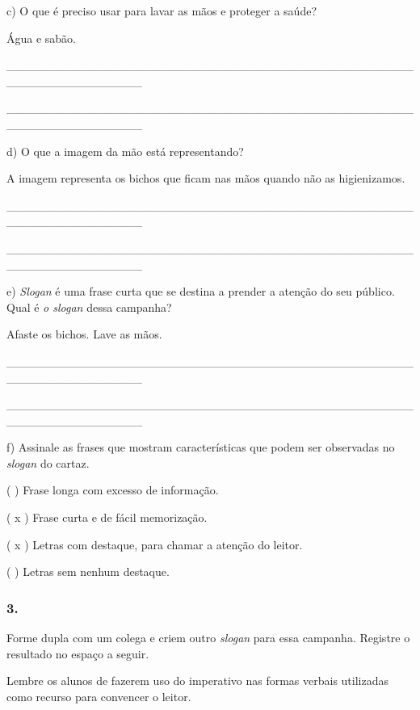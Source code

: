 c) O que é preciso usar para lavar as mãos e proteger a saúde?

Água e sabão.

\_\_\_\_\_\_\_\_\_\_\_\_\_\_\_\_\_\_\_\_\_\_\_\_\_\_\_\_\_\_\_\_\_\_\_\_\_\_\_\_\_\_\_\_\_\_\_\_\_\_\_\_\_\_\_\_\_\_\_\_\_\_\_\_

\_\_\_\_\_\_\_\_\_\_\_\_\_\_\_\_\_\_\_\_\_\_\_\_\_\_\_\_\_\_\_\_\_\_\_\_\_\_\_\_\_\_\_\_\_\_\_\_\_\_\_\_\_\_\_\_\_\_\_\_\_\_\_\_

d) O que a imagem da mão está representando?

A imagem representa os bichos que ficam nas mãos quando não as
higienizamos.

\_\_\_\_\_\_\_\_\_\_\_\_\_\_\_\_\_\_\_\_\_\_\_\_\_\_\_\_\_\_\_\_\_\_\_\_\_\_\_\_\_\_\_\_\_\_\_\_\_\_\_\_\_\_\_\_\_\_\_\_\_\_\_\_

\_\_\_\_\_\_\_\_\_\_\_\_\_\_\_\_\_\_\_\_\_\_\_\_\_\_\_\_\_\_\_\_\_\_\_\_\_\_\_\_\_\_\_\_\_\_\_\_\_\_\_\_\_\_\_\_\_\_\_\_\_\_\_\_

e) \emph{Slogan} é uma frase curta que se destina a prender a atenção do
seu público. Qual é \emph{o slogan} dessa campanha?

Afaste os bichos. Lave as mãos.

\_\_\_\_\_\_\_\_\_\_\_\_\_\_\_\_\_\_\_\_\_\_\_\_\_\_\_\_\_\_\_\_\_\_\_\_\_\_\_\_\_\_\_\_\_\_\_\_\_\_\_\_\_\_\_\_\_\_\_\_\_\_\_\_

\_\_\_\_\_\_\_\_\_\_\_\_\_\_\_\_\_\_\_\_\_\_\_\_\_\_\_\_\_\_\_\_\_\_\_\_\_\_\_\_\_\_\_\_\_\_\_\_\_\_\_\_\_\_\_\_\_\_\_\_\_\_\_\_

f) Assinale as frases que mostram características que podem ser
observadas no \emph{slogan} do cartaz.

( ) Frase longa com excesso de informação.

( x ) Frase curta e de fácil memorização.

( x ) Letras com destaque, para chamar a atenção do leitor.

( ) Letras sem nenhum destaque.

\subsubsection{3.}\label{section-41}

Forme dupla com um colega e criem outro \emph{slogan} para essa
campanha. Registre o resultado no espaço a seguir.

Lembre os alunos de fazerem uso do imperativo nas formas verbais
utilizadas como recurso para convencer o leitor.

